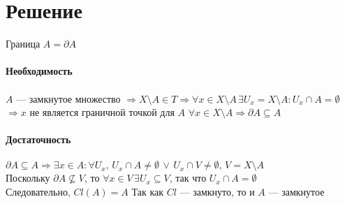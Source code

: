 \documentclass{article}
\begin{document}
        \section*{Решение}
Граница \( A = \partial A \)\\\\
\textbf{Необходимость}\\\\
\( A \) — замкнутое множество \(\Rightarrow X \setminus A \in T \Rightarrow \forall x \in X \setminus A \, \exists U_x = X \setminus A : U_x \cap A = \emptyset\)
\(\Rightarrow x\) не является граничной точкой для \( A \) \(\forall x \in X \setminus A \Rightarrow \partial A \subseteq A\)\\\\
\textbf{Достаточность}\\\\
\(\partial A \subseteq A \Rightarrow \exists x \in A : \forall U_x, \, U_x \cap A \neq \emptyset \, \lor \, U_x \cap V \neq \emptyset, \, V = X \setminus A\)\\
Поскольку \(\partial A \nsubseteq V\), то \(\forall x \in V \, \exists U_x \subseteq V\), так что \( U_x \cap A = \emptyset \)\\
Следовательно, \( Cl(A) = A \)
Так как \( Cl \) — замкнуто, то и \( A \) — замкнутое

        
               
        
\end{document}
